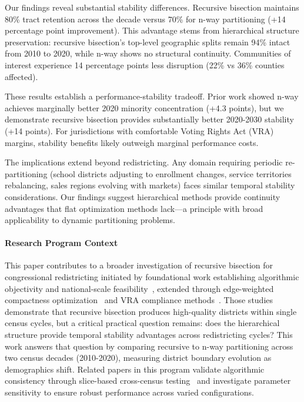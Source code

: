 Our findings reveal substantial stability differences. Recursive bisection maintains 80\% tract retention across the decade versus 70\% for n-way partitioning (+14 percentage point improvement). This advantage stems from hierarchical structure preservation: recursive bisection's top-level geographic splits remain 94\% intact from 2010 to 2020, while n-way shows no structural continuity. Communities of interest experience 14 percentage points less disruption (22\% vs 36\% counties affected).

These results establish a performance-stability tradeoff. Prior work showed n-way achieves marginally better 2020 minority concentration (+4.3 points), but we demonstrate recursive bisection provides substantially better 2020-2030 stability (+14 points). For jurisdictions with comfortable Voting Rights Act (VRA) margins, stability benefits likely outweigh marginal performance costs.

The implications extend beyond redistricting. Any domain requiring periodic re-partitioning (school districts adjusting to enrollment changes, service territories rebalancing, sales regions evolving with markets) faces similar temporal stability considerations. Our findings suggest hierarchical methods provide continuity advantages that flat optimization methods lack—a principle with broad applicability to dynamic partitioning problems.

\paragraph{Research Program Context} This paper contributes to a broader investigation of recursive bisection for congressional redistricting initiated by foundational work establishing algorithmic objectivity and national-scale feasibility~\cite{della-libera-recursive-bisection}, extended through edge-weighted compactness optimization~\cite{della-libera-edge-weighted} and VRA compliance methods~\cite{della-libera-vra-compliance}. Those studies demonstrate that recursive bisection produces high-quality districts within single census cycles, but a critical practical question remains: does the hierarchical structure provide temporal stability advantages across redistricting cycles? This work answers that question by comparing recursive to n-way partitioning across two census decades (2010-2020), measuring district boundary evolution as demographics shift. Related papers in this program validate algorithmic consistency through slice-based cross-census testing~\cite{della-libera-cross-census-validation} and investigate parameter sensitivity to ensure robust performance across varied configurations.
